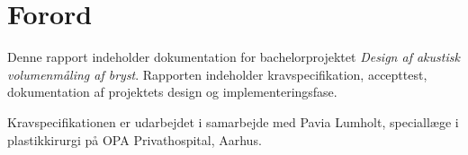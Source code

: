 \chapter*{Forord}

Denne rapport indeholder dokumentation for bachelorprojektet \textit{Design af akustisk volumenmåling af bryst}. Rapporten indeholder kravspecifikation, accepttest, dokumentation af projektets design og implementeringsfase. 

Kravspecifikationen er udarbejdet i samarbejde med Pavia Lumholt, speciallæge i plastikkirurgi på OPA Privathospital, Aarhus. 

\vspace{2cm}


\begin{centering}
\begin{multicols}{2}

\columnbreak
{}

\end{multicols}
\end{centering}

\vspace{1cm}





